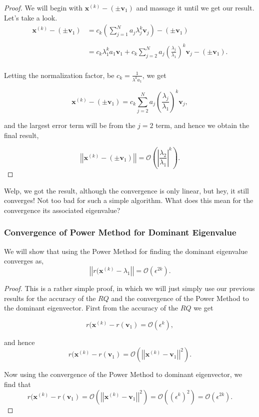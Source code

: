 \documentclass[paper=a4, fontsize=11pt]{scrartcl} %
\numberwithin{equation}{section} %
\numberwithin{figure}{section} %
\numberwithin{table}{section} %
\begin{document}
 \begin{proof}
 
We will begin with $\textbf{x}^{(k)} - (\pm \textbf{v}_1)$ and massage it until we get our result. Let's take a look.
\begin{align*}
\textbf{x}^{(k)} - (\pm \textbf{v}_1) &= c_k \left( \sum_{j=1}^N a_j \lambda_j^k \textbf{v}_j \right) - (\pm \textbf{v}_1) \\ \\
 	&= c_k \lambda_1^k a_1 \textbf{v}_1 + c_k \sum_{j=2}^N a_j \left( \frac{ \lambda_j}{\lambda_1} \right)^k \textbf{v}_j - (\pm \textbf{v}_1). \\
\end{align*}

Letting the normalization factor, be $c_k = \frac{1}{ \lambda^k a_1 }$, we get

$$\textbf{x}^{(k)} - (\pm \textbf{v}_1) = c_k \sum_{j=2}^N a_j \left( \frac{ \lambda_j}{\lambda_1} \right)^k \textbf{v}_j,$$ 

and the largest error term will be from the $j=2$ term, and hence we obtain the final result, 

$$\left|\left| \textbf{x}^{(k)} - (\pm \textbf{v}_1) \right| \right| = \mathcal{O}\left( \left| \frac{\lambda_2}{\lambda_1}  \right|^k  \right).$$

\end{proof}

Welp, we got the result, although the convergence is only linear, but hey, it still converges! Not too bad for such a simple algorithm. What does this mean for the convergence its associated eigenvalue? 

%
%
\subsubsection{Convergence of Power Method for Dominant Eigenvalue}

We will show that using the Power Method for finding the dominant eigenvalue converges as, $$\left|\left| r(\textbf{x}^{(k)} - \lambda_1 \right|\right| = \mathcal{O}\left( \epsilon^{2k} \right).$$

\begin{proof}

This is a rather simple proof, in which we will just simply use our previous results for the accuracy of the $RQ$ and the convergence of the Power Method to the dominant eigenvector. First from the accuracy of the $RQ$ we get 

$$r(\textbf{x}^{(k)} - r(\textbf{v}_1) =  \mathcal{O}\left(\epsilon^k\right),$$

and hence $$r(\textbf{x}^{(k)} - r(\textbf{v}_1) = \mathcal{O}\left( \left|\left| \textbf{x}^{(k)} - \textbf{v}_1   \right|\right|^2  \right).$$

Now using the convergence of the Power Method to dominant eigenvector, we find that $$r(\textbf{x}^{(k)} - r(\textbf{v}_1) = \mathcal{O}\left( \left|\left| \textbf{x}^{(k)} - \textbf{v}_1   \right|\right|^2  \right) = \mathcal{O}\left( \left( \epsilon^k \right) ^2 \right) = \mathcal{O}\left( \epsilon^{2k}  \right).$$

\end{proof}
\end{document}
